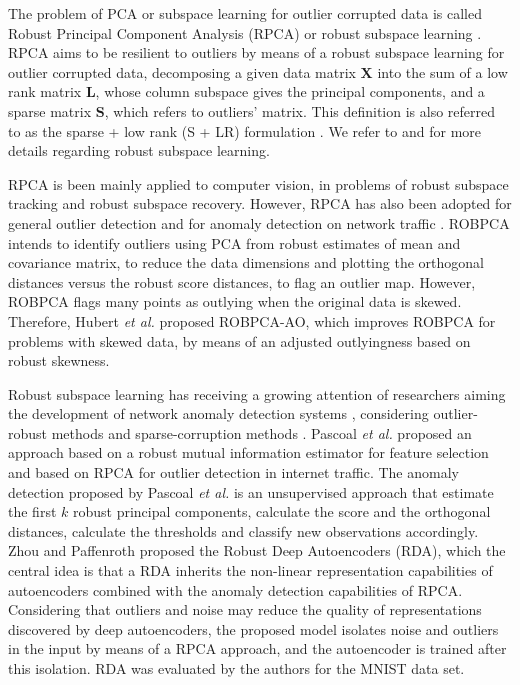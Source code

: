 The problem of PCA or subspace learning for outlier corrupted data is called Robust Principal Component Analysis (RPCA) or robust subspace learning \cite{candes2011robust, vaswani2018robust}. RPCA aims to be resilient to outliers by means of a robust subspace learning \cite{vaswani2018robust} for outlier corrupted data, decomposing a given data matrix $\textbf{X}$ into the sum of a low rank matrix $\textbf{L}$, whose column subspace gives the principal components, and a sparse matrix $\textbf{S}$, which refers to outliers’ matrix. This definition is also referred to as the sparse + low rank (S + LR) formulation \cite{vaswani2018robust}. We refer to \cite{lerman2018overview} and \cite{vaswani2018robust} for more details regarding robust subspace learning.

RPCA is been mainly applied to computer vision, in problems of robust subspace tracking and robust subspace recovery. However, RPCA has also been adopted for general outlier detection \cite{hubert2005robpca,hubert2009robustskewed,cherapanamjeri2017thresholding,zhou2017anomaly,NetflixSurus} and for anomaly detection on network traffic \cite{pascoal2012robust}. ROBPCA \cite{hubert2005robpca} intends to identify outliers using PCA from robust estimates of mean and covariance matrix, to reduce the data dimensions and plotting the orthogonal distances versus the robust score distances, to flag an outlier map. However, ROBPCA flags many points as outlying when the original data is skewed. Therefore, Hubert \emph{et al.} \cite{hubert2009robustskewed} proposed ROBPCA-AO, which improves ROBPCA for problems with skewed data, by means of an adjusted outlyingness based on robust skewness. 

Robust subspace learning has receiving a growing attention of researchers aiming the development of network anomaly detection systems \cite{rousseeuw1984mcd, rousseeuw1999fastmcd, hubert2005robpca,hubert2009robustskewed, pascoal2012robust, zhou2017anomaly}, considering outlier-robust methods and sparse-corruption methods \cite{lerman2018overview}. Pascoal \emph{et al.} \cite{pascoal2012robust} proposed an approach based on a robust mutual information estimator for feature selection and based on RPCA for outlier detection in internet traffic. The anomaly detection proposed by Pascoal \emph{et al.} is an unsupervised approach that estimate the first $k$ robust principal components, calculate the score and the orthogonal distances, calculate the thresholds and classify new observations accordingly. Zhou and Paffenroth \cite{zhou2017anomaly} proposed the Robust Deep Autoencoders (RDA), which the central idea is that a RDA inherits the non-linear representation capabilities of autoencoders combined with the anomaly detection capabilities of RPCA. Considering that outliers and noise may reduce the quality of representations discovered by deep autoencoders, the proposed model isolates noise and outliers in the input by means of a RPCA approach, and the autoencoder is trained after this isolation. RDA was evaluated by the authors for the MNIST data set.

